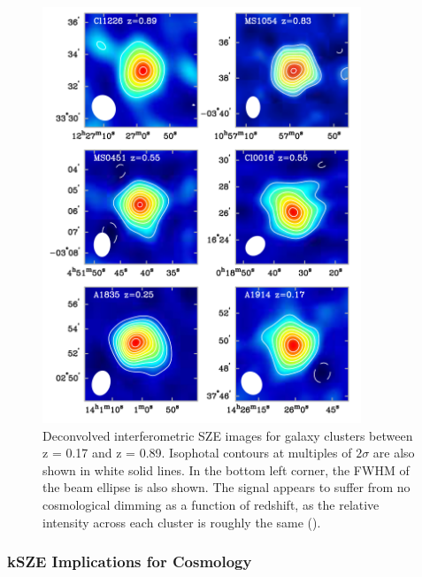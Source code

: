 \documentclass[manuscript]{aastex}
\begin{document}
\newpage
\begin{figure}[H]
\centering
\captionsetup{width=0.85\textwidth}
\includegraphics[width=0.85\textwidth]{carlstrom1.png}
\caption[An example of the redshift independence of SZE measurements for six different clusters. -(\cite{Carlstrom2002})]{Deconvolved interferometric SZE images for galaxy clusters between z = 0.17 and z = 0.89. Isophotal contours at multiples of \(2\sigma\) are also shown in white solid lines. In the bottom left corner, the FWHM of the beam ellipse is also shown. The signal appears to suffer from no cosmological dimming as a function of redshift, as the relative intensity across each cluster is roughly the same (\cite{Carlstrom2002}).}
\label{fig:carlstrom1}
\end{figure}

\subsubsection{\textbf{kSZE Implications for Cosmology}}
\end{document}
